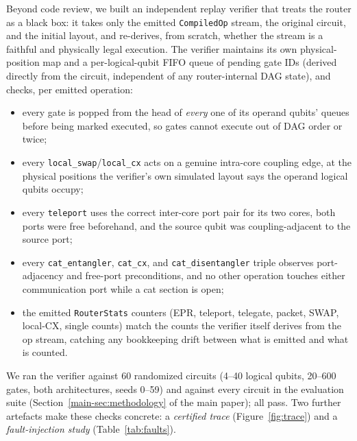 \documentclass[journal]{IEEEtran}
\newcommand{\mainEvaluation}{Section~\ref{main-sec:methodology}}
\begin{document}
Beyond code review, we built an independent replay verifier that
treats the router as a black box: it takes only the emitted
\texttt{CompiledOp} stream, the original circuit, and the initial
layout, and re-derives, from scratch, whether the stream is a faithful
and physically legal execution. The verifier maintains its own
physical-position map and a per-logical-qubit FIFO queue of pending
gate IDs (derived directly from the circuit, independent of any
router-internal DAG state), and checks, per emitted operation:
\begin{itemize}
\item every gate is popped from the head of \emph{every} one of its
  operand qubits' queues before being marked executed, so gates cannot
  execute out of DAG order or twice;
\item every \texttt{local\_swap}/\texttt{local\_cx} acts on a genuine
  intra-core coupling edge, at the physical positions the verifier's
  own simulated layout says the operand logical qubits occupy;
\item every \texttt{teleport} uses the correct inter-core port pair for
  its two cores, both ports were free beforehand, and the source
  qubit was coupling-adjacent to the source port;
\item every \texttt{cat\_entangler}, \texttt{cat\_cx}, and
  \texttt{cat\_disentangler} triple observes port-adjacency and
  free-port preconditions, and no other operation touches either
  communication port while a cat section is open;
\item the emitted \texttt{RouterStats} counters (EPR, teleport,
  telegate, packet, SWAP, local-CX, single counts) match the counts
  the verifier itself derives from the op stream, catching any
  bookkeeping drift between what is emitted and what is counted.
\end{itemize}
We ran the verifier against 60 randomized circuits (4--40 logical
qubits, 20--600 gates, both architectures, seeds 0--59) and against
every circuit in the evaluation suite (\mainEvaluation{} of the main
paper);
all pass. Two further artefacts make these checks concrete: a
\emph{certified trace} (Figure~\ref{fig:trace}) and a
\emph{fault-injection study} (Table~\ref{tab:faults}).
\end{document}
